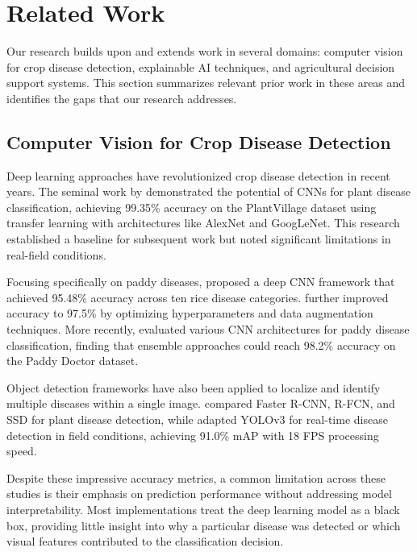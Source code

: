 \section{Related Work}

Our research builds upon and extends work in several domains: computer vision for crop disease detection, explainable AI techniques, and agricultural decision support systems. This section summarizes relevant prior work in these areas and identifies the gaps that our research addresses.

\subsection{Computer Vision for Crop Disease Detection}

Deep learning approaches have revolutionized crop disease detection in recent years. The seminal work by \cite{mohanty2016using} demonstrated the potential of CNNs for plant disease classification, achieving 99.35\% accuracy on the PlantVillage dataset using transfer learning with architectures like AlexNet and GoogLeNet. This research established a baseline for subsequent work but noted significant limitations in real-field conditions.

Focusing specifically on paddy diseases, \cite{lu2017identification} proposed a deep CNN framework that achieved 95.48\% accuracy across ten rice disease categories. \cite{rahman2020deep} further improved accuracy to 97.5\% by optimizing hyperparameters and data augmentation techniques. More recently, \cite{singh2023comparative} evaluated various CNN architectures for paddy disease classification, finding that ensemble approaches could reach 98.2\% accuracy on the Paddy Doctor dataset.

Object detection frameworks have also been applied to localize and identify multiple diseases within a single image. \cite{fuentes2017robust} compared Faster R-CNN, R-FCN, and SSD for plant disease detection, while \cite{liu2020yolo} adapted YOLOv3 for real-time disease detection in field conditions, achieving 91.0\% mAP with 18 FPS processing speed.

Despite these impressive accuracy metrics, a common limitation across these studies is their emphasis on prediction performance without addressing model interpretability. Most implementations treat the deep learning model as a black box, providing little insight into why a particular disease was detected or which visual features contributed to the classification decision.

